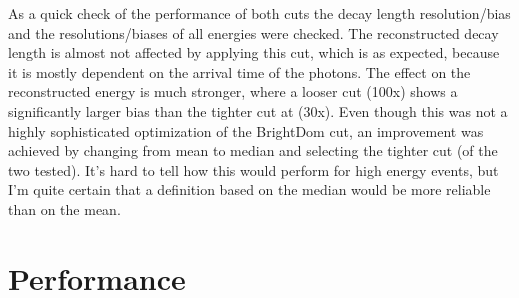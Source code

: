 
As a quick check of the performance of both cuts the decay length resolution/bias and the resolutions/biases of all energies were checked. The reconstructed decay length is almost not affected by applying this cut, which is as expected, because it is mostly dependent on the arrival time of the photons. The effect on the reconstructed energy is much stronger, where a looser cut (100x) shows a significantly larger bias than the tighter cut at (30x). Even though this was not a highly sophisticated optimization of the BrightDom cut, an improvement was achieved by changing from mean to median and selecting the tighter cut (of the two tested). It's hard to tell how this would perform for high energy events, but I'm quite certain that a definition based on the median would be more reliable than on the mean.


\section{Performance}

